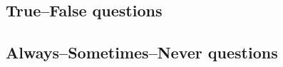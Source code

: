 
\subsection*{True--False questions}


\begin{chapex}
\label{cqAdditionalTopicsTFBegin}

\end{chapex}

\begin{chapex}

\end{chapex}

\begin{chapex}
\label{cqAdditionalTopicsTFEnd}
\end{chapex}

\subsection*{Always--Sometimes--Never questions}


\begin{chapex}
\label{cqAdditionalTopicsASNBegin}

\end{chapex}

\begin{chapex}

\end{chapex}

\begin{chapex}
\label{cqAdditionalTopicsASNEnd}

\end{chapex}